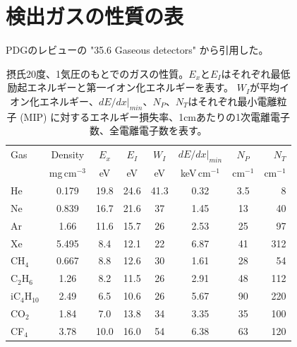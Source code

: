\documentclass [11pt,a4paper,dvipdfmx] {jarticle}
\begin{document}
\section{検出ガスの性質の表}
PDGのレビュー\cite{10.1093/ptep/ptaa104}の "35.6 Gaseous detectors" から引用した。
\label{gas_property}
\begin{table}[H]
\begin{center}
    \caption{摂氏20度、1気圧のもとでのガスの性質。$E_x$と$E_I$はそれぞれ最低励起エネルギーと第一イオン化エネルギーを表す。
    $W_I$が平均イオン化エネルギー、$dE/dx|_{min}$、$N_P$、$N_T$はそれぞれ最小電離粒子 (MIP) に対するエネルギー損失率、1cmあたりの1次電離電子数、全電離電子数を表す。}
    \begin{tabular}{lccccccr}
    \hline \hline
        Gas & Density & $ E_{x}$ & $E_{I}$ & $W_I$ & $dE/dx|_{min}$ & $N_P$ & $N_T$ \\
           & mg\,cm$^{-3}$ & eV & eV & eV & keV\,cm$^{-1}$ & cm$^{-1}$ & cm$^{-1}$ \\ \hline
           He             & 0.179 & 19.8 & 24.6 & 41.3 & 0.32 & 3.5 &   8 \\
           Ne             & 0.839 & 16.7 & 21.6 & 37   & 1.45 & 13  &  40 \\
           Ar             & 1.66  & 11.6 & 15.7 & 26   & 2.53 & 25  &  97 \\
           Xe             & 5.495 & 8.4  & 12.1 & 22   & 6.87 & 41  & 312 \\
           CH$_4$         & 0.667 & 8.8  & 12.6 & 30   & 1.61 & 28  & 54 \\
           C$_2$H$_6$     & 1.26  & 8.2  & 11.5 & 26   & 2.91 & 48  & 112 \\
           iC$_4$H$_{10}$ & 2.49  & 6.5  & 10.6 & 26   & 5.67 & 90  & 220 \\
           CO$_2$         & 1.84  & 7.0  & 13.8 & 34   & 3.35 & 35  & 100 \\
           CF$_4$         & 3.78  & 10.0 & 16.0 & 54   & 6.38 & 63  & 120 \\ \hline \hline
    \end{tabular}
\end{center}
\end{table}

\nocite{*}
%
%


\end{document}
